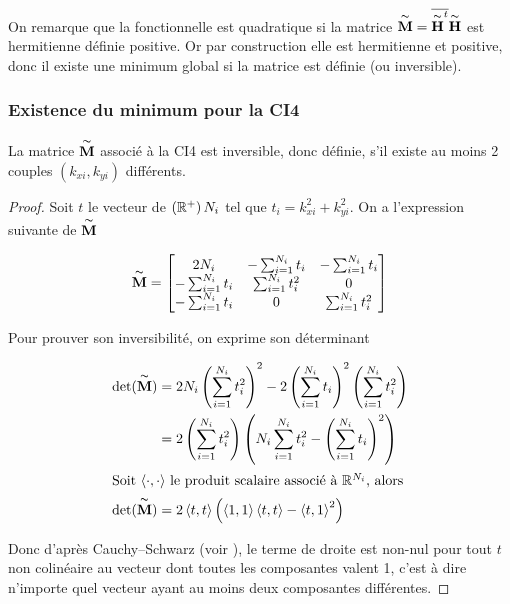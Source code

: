   On remarque que la fonctionnelle est quadratique si la matrice \(\overset{\thicksim}{\mathbf{M}}={\overline{\overset{\thicksim}{\mathbf{H}}^t}}\overset{\thicksim}{\mathbf{H}}\) est hermitienne définie positive. Or par construction elle est hermitienne et positive, donc il existe une minimum global si la matrice est définie (ou inversible). 

  \subsubsection{Existence du minimum pour la CI4}

  \begin{prop}
    La matrice \(\overset{\thicksim}{\mathbf{M}}\) associé à la CI4 est inversible, donc définie, s'il existe au moins 2 couples \((k_{xi},k_{yi})\) différents.
  \end{prop}

  \begin{proof}
    Soit \(t\) le vecteur de \(\left(\mathbb R^+\right){N_{i}}\) tel que \(t_i = k_{xi}^2 + k_{yi}^2\). On a l'expression suivante de \(\overset{\thicksim}{\mathbf{M}}\)

    \begin{equation}
      \overset{\thicksim}{\mathbf{M}} = \begin{bmatrix}
      2 N_{i} & -\sum_{i=1}^{N_{i}} t_i & -\sum_{i=1}^{N_{i}} t_i
      \\
      -\sum_{i=1}^{N_{i}} t_i & \sum_{i=1}^{N_{i}} t_i^2 & 0
      \\
      -\sum_{i=1}^{N_{i}} t_i & 0 & \sum_{i=1}^{N_{i}} t_i^2
      \end{bmatrix}
    \end{equation}

    Pour prouver son inversibilité, on exprime son déterminant 

    \begin{align}
      \det( \overset{\thicksim}{\mathbf{M}}) &= 2N_{i}\left(\sum_{i=1}^{N_{i}} t_i^2\right)^2 - 2 \left( \sum_{i=1}^{N_{i}} t_i\right)^2 \left(\sum_{i=1}^{N_{i}}t_i^2\right) 
      \\
      &= 2\left(\sum_{i=1}^{N_{i}} t_i^2\right)\left(N_{i}\sum_{i=1}^{N_{i}} t_i^2 - \left( \sum_{i=1}^{N_{i}} t_i\right)^2 \right)
      \\
      \intertext{Soit \(\left<\cdot,\cdot\right>\) le produit scalaire associé à \(\mathbb R^{N_{i}}\), alors}
      \det( \overset{\thicksim}{\mathbf{M}}) &= 2\left<t,t\right>\left( \left<1,1\right>\left<t,t\right>- \left<t,1\right>^2\right)
    \end{align}

    Donc d'après Cauchy–Schwarz (voir \cite[\href{https://dlmf.nist.gov/1.7\#E1}{eq.~1.7.1}]{dlmf_nist_2019}), le terme de droite est non-nul pour tout \(t\) non colinéaire au vecteur dont toutes les composantes valent 1, c'est à dire n'importe quel vecteur ayant au moins deux composantes différentes.
  \end{proof}

